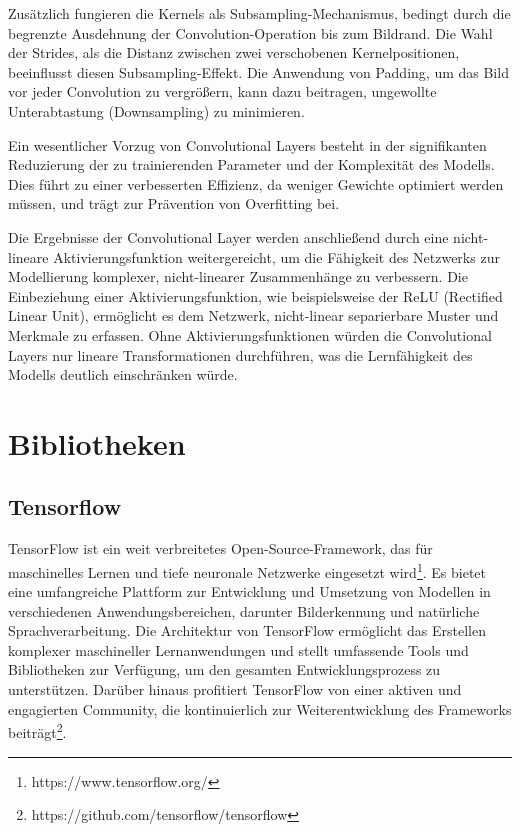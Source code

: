 Zusätzlich fungieren die Kernels als Subsampling-Mechanismus, bedingt durch die begrenzte Ausdehnung der Convolution-Operation bis zum Bildrand. Die Wahl der Strides, als die Distanz zwischen zwei verschobenen Kernelpositionen, beeinflusst diesen Subsampling-Effekt. Die Anwendung von Padding, um das Bild vor jeder Convolution zu vergrößern, kann dazu beitragen, ungewollte Unterabtastung (Downsampling) zu minimieren.

Ein wesentlicher Vorzug von Convolutional Layers besteht in der signifikanten Reduzierung der zu trainierenden Parameter und der Komplexität des Modells. Dies führt zu einer verbesserten Effizienz, da weniger Gewichte optimiert werden müssen, und trägt zur Prävention von Overfitting bei\cite{Yamashita.2018,OShea.2015}.

Die Ergebnisse der Convolutional Layer werden anschließend durch eine nicht-lineare Aktivierungsfunktion weitergereicht, um die Fähigkeit des Netzwerks zur Modellierung komplexer, nicht-linearer Zusammenhänge zu verbessern. Die Einbeziehung einer Aktivierungsfunktion, wie beispielsweise der ReLU (Rectified Linear Unit), ermöglicht es dem Netzwerk, nicht-linear separierbare Muster und Merkmale zu erfassen. Ohne Aktivierungsfunktionen würden die Convolutional Layers nur lineare Transformationen durchführen, was die Lernfähigkeit des Modells deutlich einschränken würde\cite{Sharma.2017}.

\section{Bibliotheken}
\subsection{Tensorflow}
TensorFlow ist ein weit verbreitetes Open-Source-Framework, das für maschinelles Lernen und tiefe neuronale Netzwerke eingesetzt wird\footnote{https://www.tensorflow.org/}. Es bietet eine umfangreiche Plattform zur Entwicklung und Umsetzung von Modellen in verschiedenen Anwendungsbereichen, darunter Bilderkennung und natürliche Sprachverarbeitung. Die Architektur von TensorFlow ermöglicht das Erstellen komplexer maschineller Lernanwendungen und stellt umfassende Tools und Bibliotheken zur Verfügung, um den gesamten Entwicklungsprozess zu unterstützen. Darüber hinaus profitiert TensorFlow von einer aktiven und engagierten Community, die kontinuierlich zur Weiterentwicklung des Frameworks beiträgt\footnote{https://github.com/tensorflow/tensorflow}.

